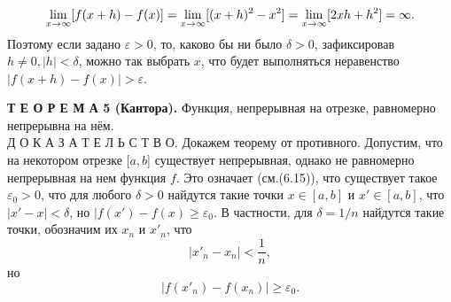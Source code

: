 \documentclass{book}
\begin{document}
\begin{equation} \notag
\lim_{x\to \infty} 	[f(x + h) - f(x)] = \lim_{x\to \infty} [(x + h)^2 - x^2] = \lim_{x\to \infty} [2xh + h^2] = \infty.
\end{equation}
Поэтому если задано \begin{math}\varepsilon > 0\end{math}, то, каково бы ни было \begin{math}\delta > 0\end{math}, зафиксировав \begin{math}h \neq 0, |h| < \delta \end{math}, можно так выбрать $x$, что будет выполняться неравенство
\begin{math}|f(x+h) - f(x)| > \varepsilon \end{math}.
\par\textsf{\textbf{\small{Т Е О Р Е М А 5 (Кантора).}}} Функция, непрерывная на отрезке, равномерно непрерывна на нём. \medskip
\\ \textsf{\small{Д О К А З А Т Е Л Ь С Т В О.}} Докажем теорему от противного. Допустим, что на некотором отрезке
[$a,b$] существует непрерывная, однако не равномерно непрерывная на нем функция $f$. Это означает (см.(6.15)), что существует такое \begin{math}\varepsilon_{0} > 0\end{math}, что для любого \begin{math}\delta > 0\end{math} найдутся такие точки \begin{math}x \in [a, b]\end{math} и \begin{math}x' \in [a, b]\end{math}, что \begin{math}|x'-x| < \delta \end{math}, но \begin{math}|f(x') - f(x) \geqslant \varepsilon_{0} \end{math}. В частности, для 
\begin{math}\delta = 1 / n\end{math} найдутся такие точки, обозначим их $x_{n}$ и $x'_{n}$, что
\begin{equation} \tag{6.16}
|x'_{n} - x_{n}| < \frac{1}{n},
\end{equation} но
\begin{equation} \tag{6.17}
|f(x'_{n}) - f(x_{n})| \geqslant \varepsilon_{0}.
\end{equation}
\end{document}
